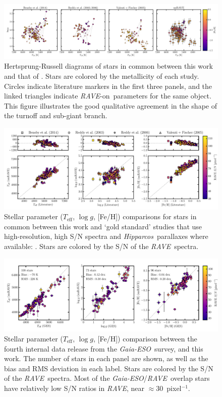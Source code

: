 \documentclass[preprint]{aastex}
\newcommand{\acronym}[1]{{\small{#1}}}
\newcommand{\project}[1]{\textsl{#1}}
\newcommand{\rave}{\project{\acronym{RAVE}}}
\newcommand{\ges}{\project{Gaia-ESO}}
\newcommand{\hipparcos}{\project{Hipparcos}}
\newcommand{\raveon}{\rave-on}
\newcommand{\teff}{T_{\mathrm{eff}}}
\newcommand{\logg}{\log g}
\begin{document}
\begin{figure}[p]
\includegraphics[width=\textwidth]{gold-standard-hrd.pdf}
\caption{Hertsprung-Russell diagrams of stars in common between this work and that of \citet{Bensby_2014,Reddy_2003,Reddy_2006,Valenti_Fischer_2005}.  Stars are colored by the metallicity of each study. Circles indicate literature markers in the first three panels, and the linked triangles indicate \raveon\ parameters for the same object. This figure illustrates the good qualitative agreement in the shape of the turnoff and sub-giant branch.\label{fig:gold-standard-hrd}}
\end{figure}


\begin{figure}[p]
\includegraphics[width=\textwidth]{gold-standard-comparison.pdf}
\caption{Stellar parameter ($\teff$, $\logg$, [Fe/H]) comparisons for stars in common between this work and `gold standard' studies that use high-resolution, high S/N spectra and \hipparcos\ parallaxes where available: \citet{Bensby_2014,Reddy_2003,Reddy_2006,Valenti_Fischer_2005}. Stars are colored by the S/N of the \rave\ spectra. \label{fig:gold-standard-comparison}}
\end{figure}


\begin{figure}[p]
\includegraphics[width=\textwidth]{ges-comparison.pdf}
\caption{Stellar parameter ($\teff$, $\logg$, [Fe/H]) comparison between the fourth internal data release from the \ges\ survey, and this work. The number of stars in each panel are shown, as well as the bias and RMS deviation in each label. Stars are colored by the S/N of the \rave\ spectra.  Most of the \ges/\rave\ overlap stars have relatively low S/N ratios in \rave, near $\approx 30$~pixel$^{-1}$.\label{fig:ges-stellar-parameters}}
\end{figure}
\end{document}
